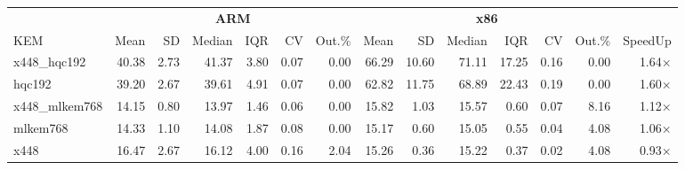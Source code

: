 \begin{table}[!ht]
\centering
\begin{tabular}{l|rrrrrr|rrrrrr|r}
\toprule
& \multicolumn{6}{c}{\bfseries ARM} & \multicolumn{6}{c}{\bfseries x86} & \\
\cmidrule(lr){2-7} \cmidrule(lr){8-13}
KEM & Mean & SD & Median & IQR & CV & Out.\% & Mean & SD & Median & IQR & CV & Out.\% & SpeedUp \\
\midrule
x448_hqc192 & 40.38 & 2.73 & 41.37 & 3.80 & 0.07 & 0.00 & 66.29 & 10.60 & 71.11 & 17.25 & 0.16 & 0.00 & 1.64× \\
hqc192 & 39.20 & 2.67 & 39.61 & 4.91 & 0.07 & 0.00 & 62.82 & 11.75 & 68.89 & 22.43 & 0.19 & 0.00 & 1.60× \\
x448_mlkem768 & 14.15 & 0.80 & 13.97 & 1.46 & 0.06 & 0.00 & 15.82 & 1.03 & 15.57 & 0.60 & 0.07 & 8.16 & 1.12× \\
mlkem768 & 14.33 & 1.10 & 14.08 & 1.87 & 0.08 & 0.00 & 15.17 & 0.60 & 15.05 & 0.55 & 0.04 & 4.08 & 1.06× \\
x448 & 16.47 & 2.67 & 16.12 & 4.00 & 0.16 & 2.04 & 15.26 & 0.36 & 15.22 & 0.37 & 0.02 & 4.08 & 0.93× \\
\bottomrule
\end{tabular}
\end{table}
